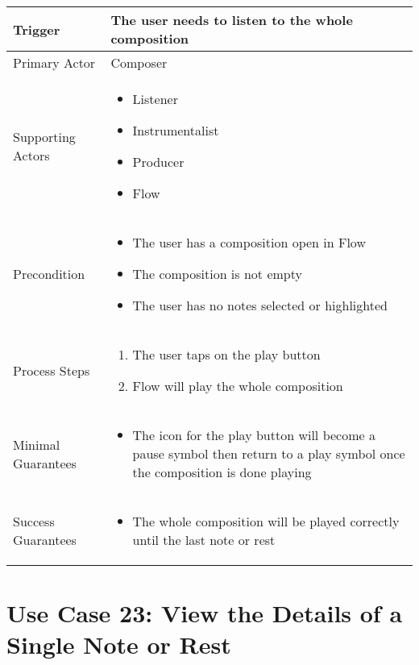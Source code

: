   \begin{tabularx}{\textwidth}{|X|X|}
  \hline
  Trigger & 
  The user needs to listen to the whole composition \\
  \hline
  Primary Actor & 
  Composer \\
  \hline
  Supporting Actors & 
  \begin{itemize}
  \item Listener
  \item Instrumentalist
  \item Producer
  \item Flow
  \end{itemize} \\
  \hline
  Precondition & 
  \begin{itemize}
  \item The user has a composition open in Flow
  \item The composition is not empty
  \item The user has no notes selected or highlighted
  \end{itemize} \\
  \hline
  Process Steps & 
  \begin{enumerate}
  \item The user taps on the play button
  \item Flow will play the whole composition
  \end{enumerate} \\
  \hline
  Minimal Guarantees & 
  \begin{itemize}
    \item The icon for the play button will become a pause symbol then return to a play symbol once the composition is done playing
  \end{itemize} \\
  \hline
  Success Guarantees & 
  \begin{itemize}
    \item The whole composition will be played correctly until the last note or rest
  \end{itemize} \\
  \hline
  \end{tabularx}

  \section{Use Case 23: View the Details of a Single Note or Rest}

